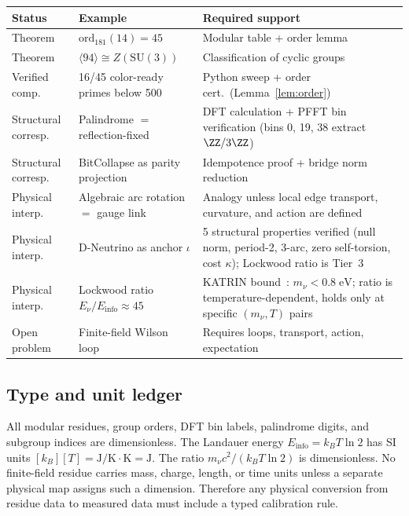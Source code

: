 \begin{center}
{\small
\begin{tabular}{@{}llp{5.5cm}@{}}
\toprule
\textbf{Status} & \textbf{Example} & \textbf{Required support} \\
\midrule
Theorem & $\mathrm{ord}_{181}(14) = 45$ & Modular table + order lemma \\
Theorem & $\langle 94 \rangle \cong Z(\mathrm{SU}(3))$ & Classification of cyclic groups \\
Verified comp. & 16/45 color-ready primes below 500 & Python sweep + order cert.\ (Lemma~\ref{lem:order}) \\
Structural corresp. & Palindrome $=$ reflection-fixed & DFT calculation + PFFT bin verification (bins 0, 19, 38 extract $\ZZ/3\ZZ$) \\
Structural corresp. & BitCollapse as parity projection & Idempotence proof + bridge norm reduction \\
Physical interp. & Algebraic arc rotation $=$ gauge link & Analogy unless local edge transport, curvature, and action are defined \\
Physical interp. & D-Neutrino as anchor $\iota$ & 5 structural properties verified (null norm, period-2, 3-arc, zero self-torsion, cost $\kappa$); Lockwood ratio is Tier~3 \\
Physical interp. & Lockwood ratio $E_\nu/E_{\mathrm{info}} \approx 45$ & KATRIN bound~\cite{katrin}: $m_\nu < 0.8\;\mathrm{eV}$; ratio is temperature-dependent, holds only at specific $(m_\nu, T)$ pairs \\
Open problem & Finite-field Wilson loop & Requires loops, transport, action, expectation \\
\bottomrule
\end{tabular}
}
\end{center}

\subsection{Type and unit ledger}

All modular residues, group orders, DFT bin labels, palindrome digits, and subgroup indices are dimensionless. The Landauer energy $E_{\mathrm{info}} = k_B T \ln 2$ has SI units $[k_B][T] = \text{J/K} \cdot \text{K} = \text{J}$. The ratio $m_\nu c^2 / (k_B T \ln 2)$ is dimensionless. No finite-field residue carries mass, charge, length, or time units unless a separate physical map assigns such a dimension. Therefore any physical conversion from residue data to measured data must include a typed calibration rule.


